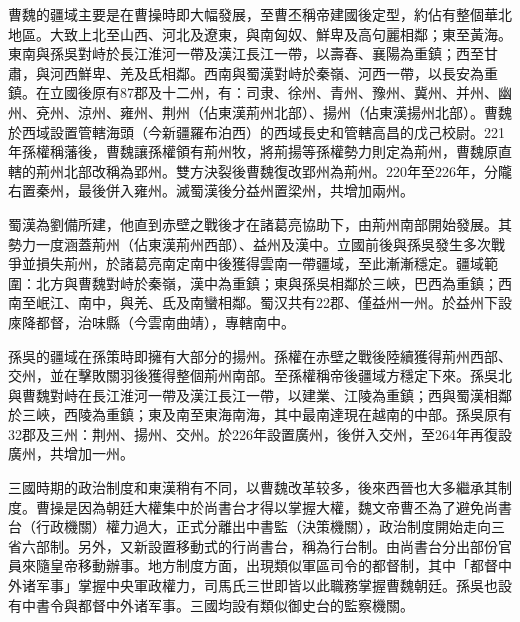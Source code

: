 曹魏的疆域主要是在曹操時即大幅發展，至曹丕稱帝建國後定型，約佔有整個華北地區。大致上北至山西、河北及遼東，與南匈奴、鮮卑及高句麗相鄰；東至黃海。東南與孫吳對峙於長江淮河一帶及漢江長江一帶，以壽春、襄陽為重鎮；西至甘肅，與河西鮮卑、羌及氐相鄰。西南與蜀漢對峙於秦嶺、河西一帶，以長安為重鎮。在立國後原有87郡及十二州，有：司隶、徐州、青州、豫州、冀州、并州、幽州、兗州、涼州、雍州、荆州（佔東漢荊州北部）、揚州（佔東漢揚州北部）。曹魏於西域設置管轄海頭（今新疆羅布泊西）的西域長史和管轄高昌的戊己校尉。221年孫權稱藩後，曹魏讓孫權領有荊州牧，將荊揚等孫權勢力則定為荊州，曹魏原直轄的荊州北部改稱為郢州。雙方決裂後曹魏復改郢州為荊州。220年至226年，分隴右置秦州，最後併入雍州。滅蜀漢後分益州置梁州，共增加兩州。

蜀漢為劉備所建，他直到赤壁之戰後才在諸葛亮協助下，由荊州南部開始發展。其勢力一度涵蓋荊州（佔東漢荊州西部）、益州及漢中。立國前後與孫吳發生多次戰爭並損失荊州，於諸葛亮南定南中後獲得雲南一帶疆域，至此漸漸穩定。疆域範圍：北方與曹魏對峙於秦嶺，漢中為重鎮；東與孫吳相鄰於三峽，巴西為重鎮；西南至岷江、南中，與羌、氐及南蠻相鄰。蜀汉共有22郡、僅益州一州。於益州下設庲降都督，治味縣（今雲南曲靖），專轄南中。

孫吳的疆域在孫策時即擁有大部分的揚州。孫權在赤壁之戰後陸續獲得荊州西部、交州，並在擊敗關羽後獲得整個荊州南部。至孫權稱帝後疆域方穩定下來。孫吳北與曹魏對峙在長江淮河一帶及漢江長江一帶，以建業、江陵為重鎮；西與蜀漢相鄰於三峽，西陵為重鎮；東及南至東海南海，其中最南達現在越南的中部。孫吳原有32郡及三州：荆州、揚州、交州。於226年設置廣州，後併入交州，至264年再復設廣州，共增加一州。

三國時期的政治制度和東漢稍有不同，以曹魏改革较多，後來西晉也大多繼承其制度。曹操是因為朝廷大權集中於尚書台才得以掌握大權，魏文帝曹丕為了避免尚書台（行政機關）權力過大，正式分離出中書監（決策機關），政治制度開始走向三省六部制。另外，又新設置移動式的行尚書台，稱為行台制。由尚書台分出部份官員來隨皇帝移動辦事。地方制度方面，出現類似軍區司令的都督制，其中「都督中外诸军事」掌握中央軍政權力，司馬氏三世即皆以此職務掌握曹魏朝廷。孫吳也設有中書令與都督中外诸军事。三國均設有類似御史台的監察機關。


